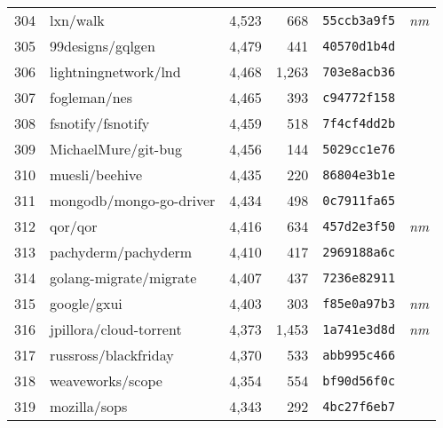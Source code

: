 {\begin{supertabular}{llrrll}
        304 &                           lxn/walk &  4,523 &    668 &  \texttt{55ccb3a9f5} &  \textit{nm} \\
        305 &                   99designs/gqlgen &  4,479 &    441 &  \texttt{40570d1b4d} &              \\
        306 &               lightningnetwork/lnd &  4,468 &  1,263 &  \texttt{703e8acb36} &              \\
        307 &                       fogleman/nes &  4,465 &    393 &  \texttt{c94772f158} &              \\
        308 &                  fsnotify/fsnotify &  4,459 &    518 &  \texttt{7f4cf4dd2b} &              \\
        309 &                MichaelMure/git-bug &  4,456 &    144 &  \texttt{5029cc1e76} &              \\
        310 &                     muesli/beehive &  4,435 &    220 &  \texttt{86804e3b1e} &              \\
        311 &            mongodb/mongo-go-driver &  4,434 &    498 &  \texttt{0c7911fa65} &              \\
        312 &                            qor/qor &  4,416 &    634 &  \texttt{457d2e3f50} &  \textit{nm} \\
        313 &                pachyderm/pachyderm &  4,410 &    417 &  \texttt{2969188a6c} &              \\
        314 &             golang-migrate/migrate &  4,407 &    437 &  \texttt{7236e82911} &              \\
        315 &                        google/gxui &  4,403 &    303 &  \texttt{f85e0a97b3} &  \textit{nm} \\
        316 &             jpillora/cloud-torrent &  4,373 &  1,453 &  \texttt{1a741e3d8d} &  \textit{nm} \\
        317 &               russross/blackfriday &  4,370 &    533 &  \texttt{abb995c466} &              \\
        318 &                   weaveworks/scope &  4,354 &    554 &  \texttt{bf90d56f0c} &              \\
        319 &                       mozilla/sops &  4,343 &    292 &  \texttt{4bc27f6eb7} &              \\

\end{supertabular}}
